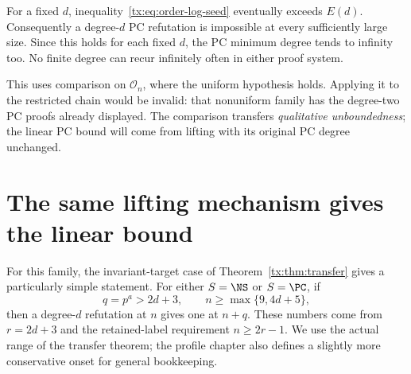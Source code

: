 For a fixed $d$, inequality~\eqref{tx:eq:order-log-seed} eventually
exceeds $E(d)$. Consequently a degree-$d$ PC refutation is impossible
at every sufficiently large size. Since this holds for each fixed
$d$, the PC minimum degree tends to infinity too. No finite degree
can recur infinitely often in either proof system.

This uses comparison on $\mathcal O_n$, where the uniform hypothesis
holds. Applying it to the restricted chain would be invalid: that
nonuniform family has the degree-two PC proofs already displayed.
The comparison transfers \emph{qualitative unboundedness}; the linear
PC bound will come from lifting with its original PC degree unchanged.

\section{The same lifting mechanism gives the linear bound}
For this family, the invariant-target case of
Theorem~\ref{tx:thm:transfer} gives a particularly simple statement.
For either $S=\NS$ or $S=\PC$, if
\begin{equation}\label{tx:eq:order-lift-range}
 q=p^a>2d+3,\qquad n\ge\max\{9,4d+5\},
\end{equation}
then a degree-$d$ refutation at $n$ gives one at $n+q$. These numbers
come from $r=2d+3$ and the retained-label requirement $n\ge2r-1$.
We use the actual range of the transfer theorem; the profile chapter
also defines a slightly more conservative onset for general bookkeeping.

